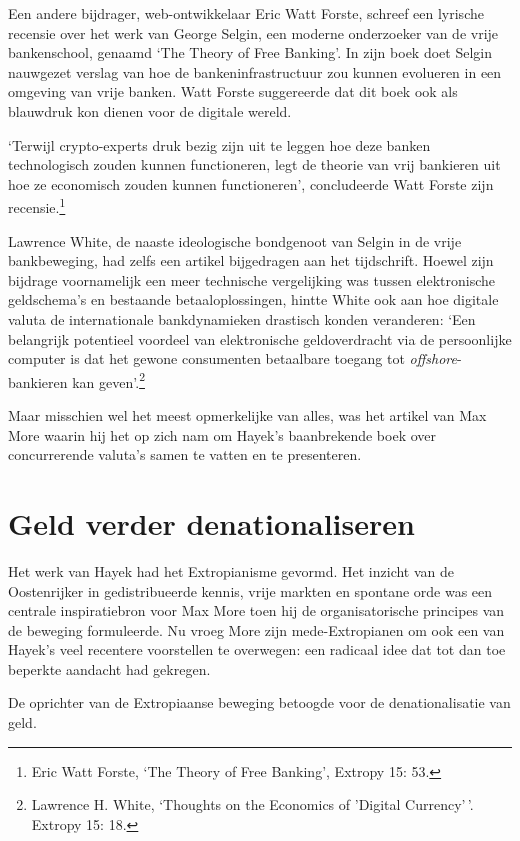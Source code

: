 \documentclass[smalldemyvopaper,11pt,twoside,onecolumn,openright,extrafontsizes,hidelinks]{memoir}
\begin{document}
Een andere bijdrager, web-ontwikkelaar Eric Watt Forste, schreef een
lyrische recensie over het werk van George Selgin, een moderne
onderzoeker van de vrije bankenschool, genaamd `The Theory of Free
Banking'. In zijn boek doet Selgin nauwgezet verslag van hoe de
bankeninfrastructuur zou kunnen evolueren in een omgeving van vrije
banken. Watt Forste suggereerde dat dit boek ook als blauwdruk kon
dienen voor de digitale wereld.

`Terwijl crypto-experts druk bezig zijn uit te leggen hoe deze banken
technologisch zouden kunnen functioneren, legt de theorie van vrij
bankieren uit hoe ze economisch zouden kunnen functioneren',
concludeerde Watt Forste zijn recensie.\footnote{Eric Watt Forste, `The
  Theory of Free Banking', Extropy 15: 53.}

Lawrence White, de naaste ideologische bondgenoot van Selgin in de vrije
bankbeweging, had zelfs een artikel bijgedragen aan het tijdschrift.
Hoewel zijn bijdrage voornamelijk een meer technische vergelijking was
tussen elektronische geldschema's en bestaande betaaloplossingen, hintte
White ook aan hoe digitale valuta de internationale bankdynamieken
drastisch konden veranderen: `Een belangrijk potentieel voordeel van
elektronische geldoverdracht via de persoonlijke computer is dat het
gewone consumenten betaalbare toegang tot \emph{offshore}-bankieren kan
geven'.\footnote{Lawrence H. White, `Thoughts on the Economics of
  'Digital Currency'\,'. Extropy 15: 18.}

Maar misschien wel het meest opmerkelijke van alles, was het artikel van
Max More waarin hij het op zich nam om Hayek's baanbrekende boek over
concurrerende valuta's samen te vatten en te presenteren.

\section{Geld verder
denationaliseren}\label{geld-verder-denationaliseren}

Het werk van Hayek had het Extropianisme gevormd. Het inzicht van de
Oostenrijker in gedistribueerde kennis, vrije markten en spontane orde
was een centrale inspiratiebron voor Max More toen hij de
organisatorische principes van de beweging formuleerde. Nu vroeg More
zijn mede-Extropianen om ook een van Hayek's veel recentere voorstellen
te overwegen: een radicaal idee dat tot dan toe beperkte aandacht had
gekregen.

De oprichter van de Extropiaanse beweging betoogde voor de
denationalisatie van geld.
\end{document}
